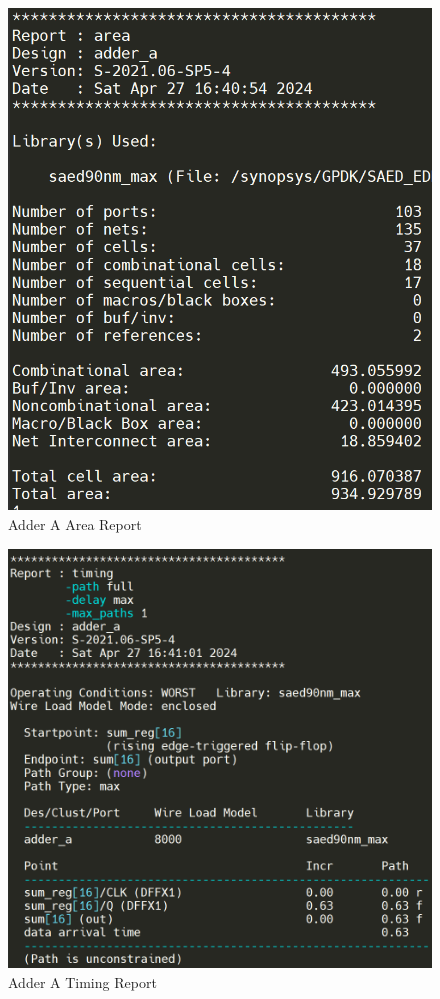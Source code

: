 \documentclass{article}
\begin{document}
\begin{figure}[!ht] 
    \centering
    \includegraphics*[width = 15.1cm]{adder_a_area.png}
    \caption{Adder A Area Report}
    \label{fig:aarea}
\end{figure}    

\begin{figure}[!ht] 
    \centering
    \includegraphics*[width = 15.1cm]{adder_a_timing.png}
    \caption{Adder A Timing Report}
    \label{fig:atiming}
\end{figure}    
\end{document}

